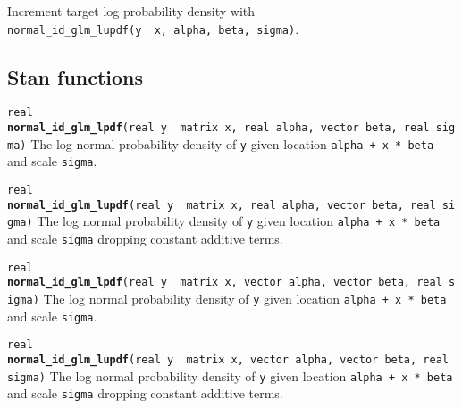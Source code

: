 \documentclass[
  10pt,
]{book}
\begin{document}
Increment target log probability density with \texttt{normal\_id\_glm\_lupdf(y\ \textbar{}\ x,\ alpha,\ beta,\ sigma)}.

\hypertarget{stan-functions-23}{%
\subsection{Stan functions}\label{stan-functions-23}}


\texttt{real} \textbf{\texttt{normal\_id\_glm\_lpdf}}\texttt{(real\ y\ \textbar{}\ matrix\ x,\ real\ alpha,\ vector\ beta,\ real\ sigma)}\newline
The log normal probability density of \texttt{y} given location \texttt{alpha\ +\ x\ *\ beta}
and scale \texttt{sigma}.


\texttt{real} \textbf{\texttt{normal\_id\_glm\_lupdf}}\texttt{(real\ y\ \textbar{}\ matrix\ x,\ real\ alpha,\ vector\ beta,\ real\ sigma)}\newline
The log normal probability density of \texttt{y} given location \texttt{alpha\ +\ x\ *\ beta}
and scale \texttt{sigma} dropping constant additive terms.


\texttt{real} \textbf{\texttt{normal\_id\_glm\_lpdf}}\texttt{(real\ y\ \textbar{}\ matrix\ x,\ vector\ alpha,\ vector\ beta,\ real\ sigma)}\newline
The log normal probability density of \texttt{y} given location \texttt{alpha\ +\ x\ *\ beta}
and scale \texttt{sigma}.


\texttt{real} \textbf{\texttt{normal\_id\_glm\_lupdf}}\texttt{(real\ y\ \textbar{}\ matrix\ x,\ vector\ alpha,\ vector\ beta,\ real\ sigma)}\newline
The log normal probability density of \texttt{y} given location \texttt{alpha\ +\ x\ *\ beta}
and scale \texttt{sigma} dropping constant additive terms.
\end{document}
